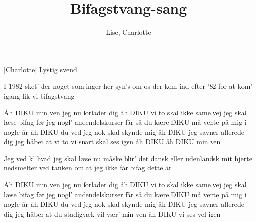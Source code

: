 \documentclass[a4paper,11pt]{article}
\title{Bifagstvang-sang}
\author{Lise, Charlotte}
\begin{document}
\maketitle

\begin{roles}
[Charlotte] Lystig svend
\end{roles}

\begin{song}
I 1982
sket' der noget som
inger her syn's om
os der kom ind efter '82
for at kom' igang
fik vi bifagstvang

Åh DIKU
min ven jeg nu forlader dig
åh DIKU
vi to skal ikke same vej
jeg skal læse bifag
før jeg nogl' andendelskurser får
så du kære DIKU
må vente på mig i nogle år
åh DIKU
du ved jeg nok skal skynde mig
åh DIKU
jeg savner allerede dig
jeg håber at vi to vi snart skal ses igen
åh DIKU
åh DIKU
min ven

Jeg ved k' hvad jeg skal læse nu
måske blir' det dansk
eller udenlandsk
mit hjerte nedsmelter ved tanken om
at jeg ikke får
bifag dette år

Åh DIKU
min ven jeg nu forlader dig
åh DIKU
vi to skal ikke same vej
jeg skal læse bifag
før jeg nogl' andendelskurser får
så du kære DIKU
må vente på mig i nogle år
åh DIKU
du ved jeg nok skal skynde mig
åh DIKU
jeg savner allerede dig
jeg håber at du stadigvæk vil vær' min ven
åh DIKU
vi ses vel
igen
\end{song}
\end{document}
